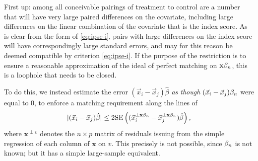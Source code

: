 \documentclass{article}
\theoremstyle{remark}
\begin{document}
First up: among all conceivable pairings of treatment to control are a
number that will have very large paired differences on the covariate,
including large differences on the linear combination of the covariate
that is the index score. As is clear from the form of
\eqref{eq:ipse-i}, pairs with large differences on the index score
will have correspondingly large standard errors, and may for this reason
be deemed compatible by criterion \eqref{eq:ipse-i}. If the
purpose of the restriction is to ensure a reasonable approximation of the
ideal of perfect matching on $\mathbf{x}\beta_{n }$, this is a loophole that
needs to be closed. 

To do this, we instead estimate the error $(\vec{x}_i - \vec{x}_j)\hat{\beta} $ \emph{as though}
$(\vec{x}_i - \vec{x}_j){\beta_{n }}$ were equal to 0, to enforce a matching requirement along the lines of
\begin{equation*}
|(\vec{x}_i - \vec{x}_j)\hat{\beta}| \leq 2 \mathrm{SE}\left( (\vec{x}_i^{\perp \mathbf{x}\beta_{n }} - \vec{x}_j^{\perp \mathbf{x}\beta_{n }})\hat{\beta}\right) ,
\end{equation*}
where $\mathbf{x}^{\perp v}$ denotes the 
$n \times p$ matrix of residuals issuing from the simple regression of
each column of $\mathbf{x}$ on $v$.  This precisely is not possible, since $\beta_{n }$ is not known; but it has a simple large-sample equivalent. 
\end{document}
